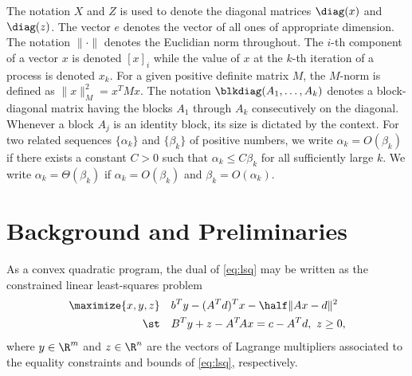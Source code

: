 \documentclass{amsart}
\begin{document}
The notation $X$ and $Z$ is used to denote the diagonal matrices $\diag(x)$ and
$\diag(z)$. The vector $e$ denotes the vector of all ones of appropriate
dimension. The notation $\|\cdot\|$ denotes the Euclidian norm throughout. The
$i$-th component of a vector $x$ is denoted $[x]_i$ while the value of $x$
at the $k$-th iteration of a process is denoted $x_k$. For a given
positive definite matrix $M$, the $M$-norm is defined as $\|x\|_M^2 = x^T M x$.
The notation $\blkdiag(A_1, \ldots, A_k)$ denotes a block-diagonal matrix
having the blocks $A_1$ through $A_k$ consecutively on the diagonal. Whenever
a block $A_j$ is an identity block, its size is dictated by the context. For
two related sequences $\{\alpha_k\}$ and $\{\beta_k\}$ of positive numbers, we
write $\alpha_k = O(\beta_k)$ if there exists a constant $C > 0$ such that
$\alpha_k \leq C \beta_k$ for all sufficiently large $k$. We write $\alpha_k =
\Theta(\beta_k)$ if $\alpha_k = O(\beta_k)$ and $\beta_k = O(\alpha_k)$.

\section{Background and Preliminaries}

As a convex quadratic program, the dual of \eqref{eq:lsq} may be written as the
constrained linear least-squares problem
\begin{equation}
  \label{eq:lsq-dual}
  \begin{aligned}
    \maximize{x,y,z} \quad &
      b^T y - (A^T d)^T x - \half \|Ax - d\|^2 \\
    \st \quad & B^T y + z - A^T \! A x = c - A^T d, \ z \geq 0,
  \end{aligned}
\end{equation}
where $y \in \R^m$ and $z \in \R^n$ are the vectors of Lagrange multipliers
associated to the equality constraints and bounds of \eqref{eq:lsq},
respectively.
\end{document}
